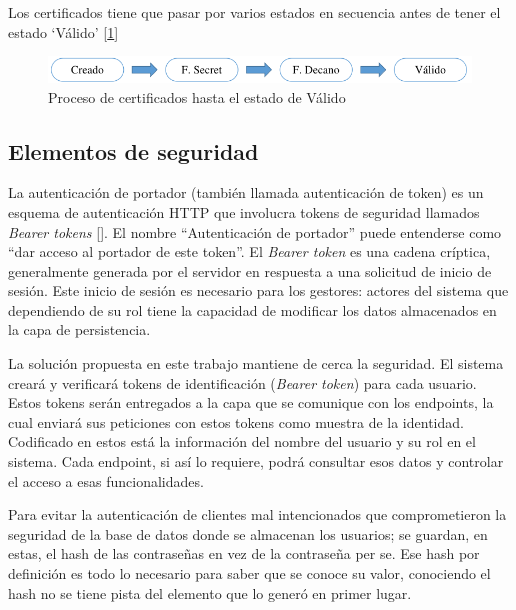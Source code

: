 Los certificados tiene que pasar por varios estados en secuencia antes de tener el estado `Válido' [\ref{fig:12}]
\begin{figure}[h]
	\includegraphics[width=\linewidth]{Graphics/status.png}
	\caption{Proceso de certificados hasta el estado de Válido}
	\label{fig:12}
\end{figure} 

\subsection{Elementos de seguridad}
La autenticación de portador (también llamada autenticación de token) es un esquema de autenticación HTTP que involucra tokens de seguridad llamados \textit{Bearer tokens} [\cite{98}]. El nombre ``Autenticación de portador'' puede entenderse como ``dar acceso al portador de este token''. El \textit{Bearer token} es una cadena críptica, generalmente generada por el servidor en respuesta a una solicitud de inicio de sesión. Este inicio de sesión es necesario para los gestores: actores del sistema que dependiendo de su rol tiene la capacidad de modificar los datos almacenados en la capa de persistencia. 

La solución propuesta en este trabajo mantiene de cerca la seguridad. El sistema creará y verificará tokens de identificación (\textit{Bearer token}) para cada usuario. Estos tokens serán entregados a la capa que se comunique con los endpoints, la cual enviará sus peticiones con estos tokens como muestra de la identidad. Codificado en estos está la información del nombre del usuario y su rol en el sistema. Cada endpoint, si así lo requiere, podrá consultar esos datos y controlar el acceso a esas funcionalidades.

Para evitar la autenticación de clientes mal intencionados que comprometieron la seguridad de la base de datos donde se almacenan los usuarios; se guardan, en estas, el hash de las contraseñas en vez de la contraseña per se. Ese hash por definición es todo lo necesario para saber que se conoce su valor, conociendo el hash no se tiene pista del elemento que lo generó en primer lugar.

